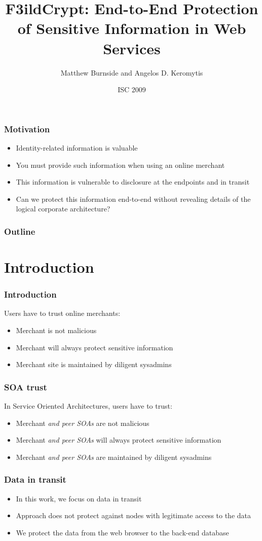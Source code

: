 \documentclass{beamer}
\title[F3ildCrypt]{F3ildCrypt: End-to-End Protection of Sensitive Information
in Web Services}
\author[Burnside, Keromytis]{Matthew Burnside and Angelos D. Keromytis}
\institute[Columbia University]{
Department of Computer Science\\
Columbia University\\
\texttt{\{mb, angelos\}@cs.columbia.edu}
}
\date{ISC 2009}
\begin{document}
\begin{frame}[plain]
    \titlepage
\end{frame}

\begin{frame}
\frametitle{Motivation}
\begin{itemize}
\item Identity-related information is valuable
\item You must provide such information when using an online merchant
\item This information is vulnerable to disclosure at the endpoints and in
transit 
\item Can we protect this information end-to-end without revealing details of
the logical corporate architecture?
\end{itemize}
\end{frame}

\begin{frame}
\frametitle{Outline}
\tableofcontents
\end{frame}

\section{Introduction}

\begin{frame}
\frametitle{Introduction}
Users have to trust online merchants:
\smallskip
\begin{itemize}
\item Merchant is not malicious
\item Merchant will always protect sensitive information
\item Merchant site is maintained by diligent sysadmins
\end{itemize}
\end{frame}

\begin{frame}
\frametitle{SOA trust}
In Service Oriented Architectures, users have to trust:
\begin{itemize}
\item Merchant \emph{and peer SOAs} are not malicious
\item Merchant \emph{and peer SOAs} will always protect sensitive information
\item Merchant \emph{and peer SOAs} are maintained by diligent sysadmins
\end{itemize}
\end{frame}

\begin{frame}
\frametitle{Data in transit}
\begin{itemize}
\item In this work, we focus on data in transit
\item Approach does not protect against nodes with legitimate access to the data
\item We protect the data from the web browser to the back-end database
\end{itemize}
\end{frame}
\end{document}
